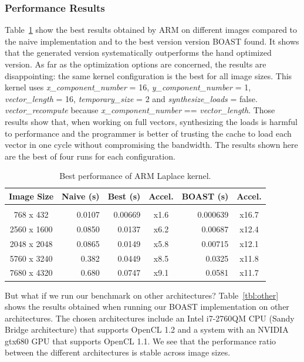 \documentclass{IEEEtran}
\begin{document}
\subsubsection{Performance Results}

Table~\ref{tbl:ARM} show the best results obtained by ARM on different images
compared to the naive implementation and to the best version version BOAST
found. It shows that the generated version systematically outperforms the hand
optimized version. As far as the optimization options are concerned, the results
are disappointing: the same kernel configuration is the best for all image
sizes. This kernel uses \emph{x\_component\_number} = 16,
\emph{y\_component\_number} = 1, \emph{vector\_length} = 16,
\emph{temporary\_size} = 2 and \emph{synthesize\_loads} = false.
\emph{vector\_recompute} because \emph{x\_component\_number}
== \emph{vector\_length}. Those results show that, when working on full
vectors, synthesizing the loads is harmful to performance and the programmer is
better of trusting the cache to load each vector in one cycle without
compromising the bandwidth. The results shown here are the best of four runs for
each configuration.

\begin{table}
\caption{Best performance of ARM Laplace kernel.}
\label{tbl:ARM}
\centering
\begin{tabular}{c|r|r|c|r|c}
  Image Size  & Naive (s) & Best (s) & Accel. & BOAST (s) & Accel. \\[4pt]
  \hline&&&&\\[-8pt]
768 x 432   & 0.0107    & 0.00669  & x1.6         & 0.000639  & x16.7 \\
2560 x 1600 & 0.0850    & 0.0137   & x6.2         & 0.00687   & x12.4 \\
2048 x 2048 & 0.0865    & 0.0149   & x5.8         & 0.00715   & x12.1 \\
5760 x 3240 & 0.382     & 0.0449   & x8.5         & 0.0325    & x11.8 \\
7680 x 4320 & 0.680     & 0.0747   & x9.1         & 0.0581    & x11.7 \\
\end{tabular}
\end{table}

But what if we run our benchmark on other architectures? Table~\ref{tbl:other}
shows the results obtained when running our BOAST implementation on other
architectures. The chosen architectures include an Intel i7-2760QM CPU (Sandy
Bridge architecture) that supports OpenCL 1.2 and a system with an NVIDIA
gtx680 GPU that supports OpenCL 1.1. We see that the performance ratio between
the different architectures is stable across image sizes.
\end{document}
